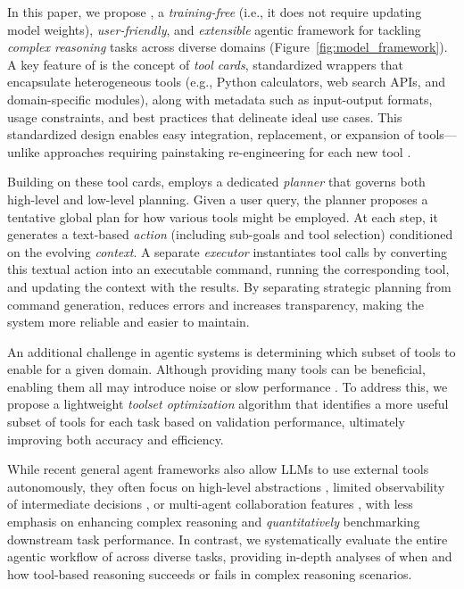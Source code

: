 In this paper, we propose \model, a \emph{training-free} (i.e., it does not require updating model weights), \emph{user-friendly}, and \emph{extensible} agentic framework for tackling \emph{complex reasoning} tasks across diverse domains (Figure~\ref{fig:model_framework}). A key feature of \model is the concept of \emph{tool cards}, standardized wrappers that encapsulate heterogeneous tools (e.g., Python calculators, web search APIs, and domain-specific modules), along with metadata such as input-output formats, usage constraints, and best practices that delineate ideal use cases. This standardized design enables easy integration, replacement, or expansion of tools—unlike approaches requiring painstaking re-engineering for each new tool \citep{lu2023chameleon, hu2024visual}.

Building on these tool cards, \model employs a dedicated \emph{planner} that governs both high-level and low-level planning. Given a user query, the planner proposes a tentative global plan for how various tools might be employed. At each step, it generates a text-based \emph{action} (including sub-goals and tool selection) conditioned on the evolving \emph{context}. A separate \emph{executor} instantiates tool calls by converting this textual action into an executable command, running the corresponding tool, and updating the context with the results. By separating strategic planning from command generation, \model reduces errors and increases transparency, making the system more reliable and easier to maintain.

An additional challenge in agentic systems is determining which subset of tools to enable for a given domain. Although providing many tools can be beneficial, enabling them all may introduce noise or slow performance \citep{lumer2024toolshed, fore2024geckopt, paramanayakam2024less}. To address this, we propose a lightweight \emph{toolset optimization} algorithm that identifies a more useful subset of tools for each task based on validation performance, ultimately improving both accuracy and efficiency.

While recent general agent frameworks also allow LLMs to use external tools autonomously, they often focus on high-level abstractions \citep{langchain}, limited observability of intermediate decisions \citep{gpt4oplugin}, or multi-agent collaboration features  \citep{autogen}, with less emphasis on enhancing complex reasoning and \emph{quantitatively} benchmarking downstream task performance. In contrast, we systematically evaluate the entire agentic workflow of \model across diverse tasks, providing in-depth analyses of when and how tool-based reasoning succeeds or fails in complex reasoning scenarios.


